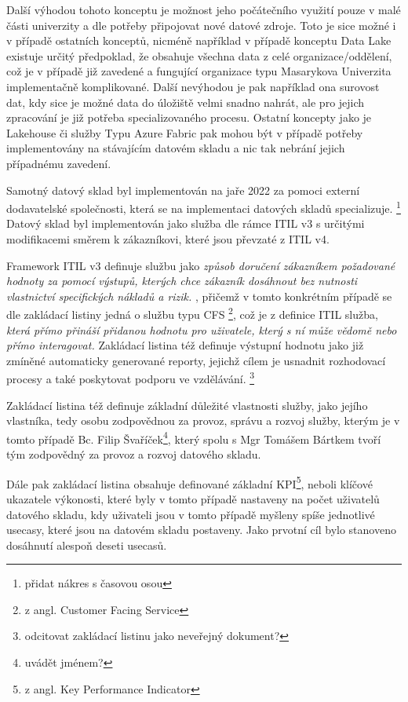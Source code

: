 \documentclass[
  digital,     %
  twoside,     %
  lof,         %
  lot,         %
]{fithesis4}
\begin{document}
Další výhodou tohoto konceptu je možnost jeho počátečního využití pouze v malé části univerzity a dle potřeby připojovat nové datové zdroje. Toto je sice možné i v případě ostatních konceptů, nicméně například v případě konceptu Data Lake existuje určitý předpoklad, že obsahuje všechna data z celé organizace/oddělení, což je v případě již zavedené a fungující organizace typu Masarykova Univerzita implementačně komplikované. Další nevýhodou je pak například ona surovost dat, kdy sice je možné data do úložiště velmi snadno nahrát, ale pro jejich zpracování je již potřeba specializovaného procesu. Ostatní koncepty jako je Lakehouse či služby Typu Azure Fabric pak mohou být v případě potřeby implementovány na stávajícím datovém skladu a nic tak nebrání jejich případnému zavedení.

Samotný datový sklad byl implementován na jaře 2022 za pomoci externí dodavatelské společnosti, která se na implementaci datových skladů specializuje. \footnote{přidat nákres s časovou osou} Datový sklad byl implementován jako služba dle rámce ITIL v3 s určitými modifikacemi směrem k zákazníkovi, které jsou převzaté z ITIL v4. 

Framework ITIL v3 definuje službu jako \emph{způsob doručení zákazníkem požadované hodnoty za pomocí výstupů, kterých chce zákazník dosáhnout bez nutnosti vlastnictví specifických nákladů a rizik.} \parencite{SyFvQA11lk1OaIec}, přičemž v tomto konkrétním případě se dle zakládací listiny jedná o službu typu CFS \footnote{z angl. Customer Facing Service}, což je z definice ITIL služba, \emph{která přímo přináší přidanou hodnotu pro uživatele, který s ní může vědomě nebo přímo interagovat.}\parencite{SyFvQA11lk1OaIec} Zakládací listina též definuje výstupní hodnotu jako již zmíněné automaticky generované reporty, jejichž cílem je usnadnit rozhodovací procesy a také poskytovat podporu ve vzdělávání. \footnote{odcitovat zakládací listinu jako neveřejný dokument?}

Zakládací listina též definuje základní důležité vlastnosti služby, jako jejího vlastníka, tedy osobu zodpovědnou za provoz, správu a rozvoj služby, kterým je v tomto případě Bc. Filip Švaříček\footnote{uvádět jménem?}, který spolu s Mgr Tomášem Bártkem tvoří tým zodpovědný za provoz a rozvoj datového skladu.

Dále pak zakládací listina obsahuje definované základní KPI\footnote{z angl. Key Performance Indicator}, neboli klíčové ukazatele výkonosti, které byly v tomto případě nastaveny na počet uživatelů datového skladu, kdy uživateli jsou v tomto případě myšleny spíše jednotlivé usecasy, které jsou na datovém skladu postaveny. Jako prvotní cíl bylo stanoveno dosáhnutí alespoň deseti usecasů.
\end{document}
